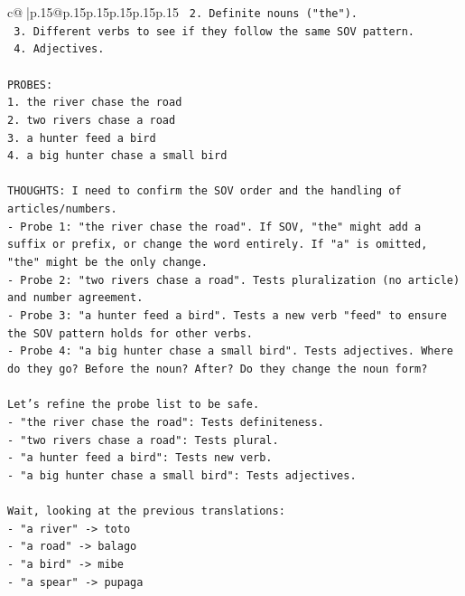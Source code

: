 \documentclass{article}
\begin{document}
{\begin{supertabular}{c@{$\;$}|p{.15\linewidth}@{}p{.15\linewidth}p{.15\linewidth}p{.15\linewidth}p{.15\linewidth}p{.15\linewidth}}
{{{\texttt{                  2. Definite nouns ("the").} \\
\texttt{                  3. Different verbs to see if they follow the same SOV pattern.} \\
\texttt{                  4. Adjectives.} \\
\\ 
\texttt{PROBES:} \\
\texttt{1. the river chase the road} \\
\texttt{2. two rivers chase a road} \\
\texttt{3. a hunter feed a bird} \\
\texttt{4. a big hunter chase a small bird} \\
\\ 
\texttt{THOUGHTS: I need to confirm the SOV order and the handling of articles/numbers.} \\
\texttt{{-} Probe 1: "the river chase the road". If SOV, "the" might add a suffix or prefix, or change the word entirely. If "a" is omitted, "the" might be the only change.} \\
\texttt{{-} Probe 2: "two rivers chase a road". Tests pluralization (no article) and number agreement.} \\
\texttt{{-} Probe 3: "a hunter feed a bird". Tests a new verb "feed" to ensure the SOV pattern holds for other verbs.} \\
\texttt{{-} Probe 4: "a big hunter chase a small bird". Tests adjectives. Where do they go? Before the noun? After? Do they change the noun form?} \\
\\ 
\texttt{Let's refine the probe list to be safe.} \\
\texttt{{-} "the river chase the road": Tests definiteness.} \\
\texttt{{-} "two rivers chase a road": Tests plural.} \\
\texttt{{-} "a hunter feed a bird": Tests new verb.} \\
\texttt{{-} "a big hunter chase a small bird": Tests adjectives.} \\
\\ 
\texttt{Wait, looking at the previous translations:} \\
\texttt{{-} "a river" {-}> toto} \\
\texttt{{-} "a road" {-}> balago} \\
\texttt{{-} "a bird" {-}> mibe} \\
\texttt{{-} "a spear" {-}> pupaga} \\
}}}
\end{supertabular}}
\end{document}

